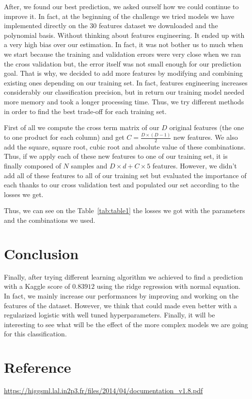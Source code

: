 \documentclass[10pt,conference,compsocconf]{IEEEtran}
\begin{document}
After, we found our best prediction, we asked ourself how we could continue to improve it. In fact, at the beginning of the challenge we tried models we have implemented directly on the 30 features dataset we downloaded and the polynomial basis. Without thinking about features engineering. It ended up with a very high bias over our estimation. In fact, it was not bother us to much when we start because the training and validation errors were very close when we ran the cross validation but, the error itself was not small enough for our prediction goal. That is why, we decided to add more features by modifying and combining existing ones depending on our training set. In fact, features engineering increases considerably our classification precision, but in return our training model needed more memory and took a longer processing time. Thus, we try different methods in order to find the best trade-off for each training set. 

First of all we compute the cross term matrix of our $D$ original features (the one to one product for each column) and get $C = \frac{D\times(D-1)}{2}$ new features. We also add the square, square root, cubic root and absolute value of these combinations. Thus, if we apply each of these new features to one of our training set, it is finally composed of $N$ samples and $D\times d + C\times5$ features. However, we didn't add all of these features to all of our training set but evaluated the importance of each thanks to our cross validation test and populated our set according to the losses we get.

Thus, we can see on the Table~\ref{tab:table1} the losses we got with the parameters and the combinations we used.

\section{Conclusion}

Finally, after trying different learning algorithm we achieved to find a prediction with a Kaggle score of $0.83912$ using the ridge regression with normal equation. In fact, we mainly increase our performances by improving and working on the features of the dataset. However, we think that could made even better with a regularized logistic with well tuned hyperparameters. Finally, it will be interesting to see what will be the effect of the more complex models we are going for this classification.

\section{Reference} \label{sec:ref}

\url{https://higgsml.lal.in2p3.fr/files/2014/04/documentation_v1.8.pdf}
\end{document}
